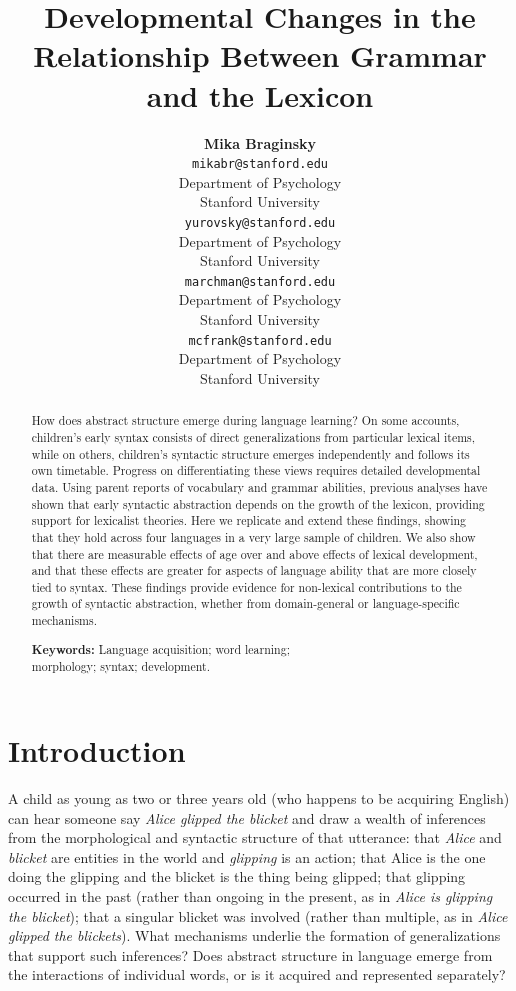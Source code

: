 \documentclass[10pt,letterpaper]{article}
\title{Developmental Changes in the Relationship Between Grammar and the Lexicon}
\author{{\large \bf Mika Braginsky} \\
  \texttt{mikabr@stanford.edu} \\
  Department of Psychology \\
  Stanford University
  \And {\large \bf Daniel Yurovsky} \\
  \texttt{yurovsky@stanford.edu} \\
  Department of Psychology \\
  Stanford University
    \And {\large \bf Virginia A. Marchman} \\
    \texttt{marchman@stanford.edu} \\
  Department of Psychology \\
  Stanford University
    \And {\large \bf Michael C. Frank}\\
    \texttt{mcfrank@stanford.edu} \\
  Department of Psychology \\
  Stanford University}
\begin{document}
\maketitle

\begin{abstract}

How does abstract structure emerge during language learning? On some accounts, children's early syntax consists of direct generalizations from particular lexical items, while on others, children's syntactic structure emerges independently and follows its own timetable. Progress on differentiating these views requires detailed developmental data. Using parent reports of vocabulary and grammar abilities, previous analyses have shown that early syntactic abstraction depends on the growth of the lexicon, providing support for lexicalist theories. Here we replicate and extend these findings, showing that they hold across four languages in a very large sample of children. We also show that there are measurable effects of age over and above effects of lexical development, and that these effects are greater for aspects of language ability that are more closely tied to syntax. These findings provide evidence for non-lexical contributions to the growth of syntactic abstraction, whether from domain-general or language-specific mechanisms.

\textbf{Keywords:} 
Language acquisition; word learning; \\morphology; syntax; development.
\end{abstract}

\section{Introduction}

A child as young as two or three years old (who happens to be acquiring English) can hear someone say \emph{Alice glipped the blicket} and draw a wealth of inferences from the morphological and syntactic structure of that utterance: that \emph{Alice} and \emph{blicket} are entities in the world and \emph{glipping} is an action; that Alice is the one doing the glipping and the blicket is the thing being glipped; that glipping occurred in the past (rather than ongoing in the present, as in \emph{Alice is glipping the blicket}); that a singular blicket was involved (rather than multiple, as in \emph{Alice glipped the blickets}). What mechanisms underlie the formation of generalizations that support such inferences? Does abstract structure in language emerge from the interactions of individual words, or is it acquired and represented separately?
\end{document}
